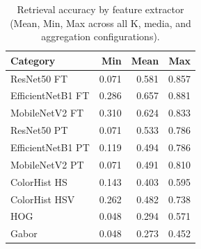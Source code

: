 \begin{table}[ht]
\centering
\caption{Retrieval accuracy by feature extractor (Mean, Min, Max across all K, media, and aggregation configurations).}
\label{tab:by_extractor}
\small
\begin{tabular}{@{}lrrr@{}}
\toprule
Category & Min & Mean & Max \\
\midrule
ResNet50 FT & 0.071 & 0.581 & 0.857 \\
EfficientNetB1 FT & 0.286 & 0.657 & 0.881 \\
MobileNetV2 FT & 0.310 & 0.624 & 0.833 \\
ResNet50 PT & 0.071 & 0.533 & 0.786 \\
EfficientNetB1 PT & 0.119 & 0.494 & 0.786 \\
MobileNetV2 PT & 0.071 & 0.491 & 0.810 \\
ColorHist HS & 0.143 & 0.403 & 0.595 \\
ColorHist HSV & 0.262 & 0.482 & 0.738 \\
HOG & 0.048 & 0.294 & 0.571 \\
Gabor & 0.048 & 0.273 & 0.452 \\
\bottomrule
\end{tabular}
\end{table}
